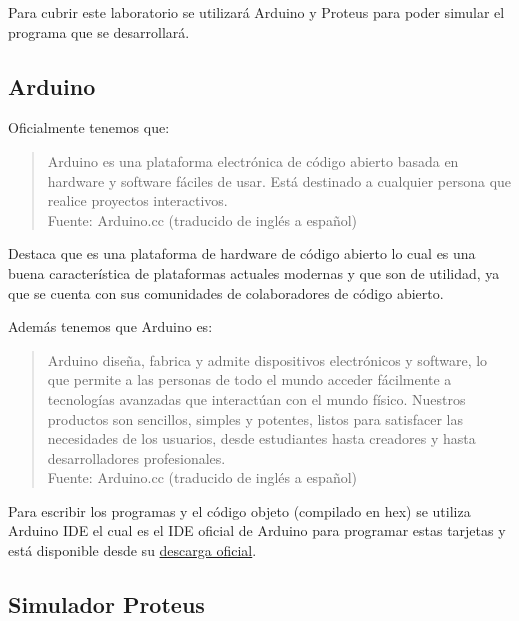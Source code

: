 \documentclass{article}
\begin{document}
    Para cubrir este laboratorio se utilizará Arduino y Proteus para poder
    simular el programa que se desarrollará.

    \subsection{Arduino}\label{subsec:arduino}

    Oficialmente tenemos que:

    \begin{quote}
        Arduino es una plataforma electrónica de código abierto basada en
        hardware y software fáciles de usar. Está destinado a cualquier
        persona que realice proyectos interactivos.\\ \footnotesize
        Fuente: Arduino.cc (traducido de inglés a español) \cite{arduino-2022}
    \end{quote}

    Destaca que es una plataforma de hardware de código abierto lo cual es
    una buena característica de plataformas actuales modernas y que son de
    utilidad, ya que se cuenta con sus comunidades de colaboradores de código
    abierto.

    Además tenemos que Arduino es:

    \begin{quote}
        Arduino diseña, fabrica y admite dispositivos electrónicos y
        software, lo que permite a las personas de todo el mundo acceder
        fácilmente a tecnologías avanzadas que interactúan con el mundo
        físico. Nuestros productos son sencillos, simples y potentes, listos
        para satisfacer las necesidades de los usuarios, desde estudiantes
        hasta creadores y hasta desarrolladores profesionales. \\ \footnotesize
        Fuente: Arduino.cc (traducido de inglés a español) \cite{arduino-2022}
    \end{quote}

    Para escribir los programas y el código objeto (compilado en hex) se
    utiliza Arduino IDE el cual es el IDE oficial de Arduino para programar
    estas tarjetas y está disponible desde su \href{https://docs.arduino.cc/software/ide-v2/tutorials/getting-started/ide-v2-downloading-and-installing}{descarga oficial}.

    \subsection{Simulador Proteus}\label{subsec:simulador-proteus}
\end{document}
